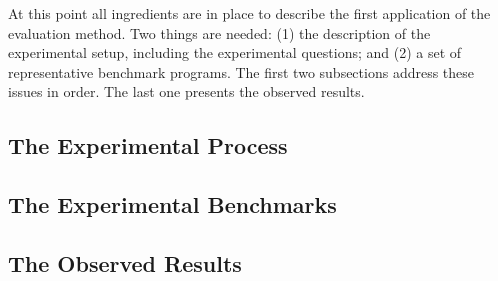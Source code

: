
At this point all ingredients are in place to describe the first application of
the evaluation method. Two things are needed: (1) the description of the
experimental setup, including the experimental questions; and (2) a set of
representative benchmark programs. The first two subsections address these
issues in order. The last one presents the observed results.

\def\rsub#1#2{\subsection{#2} \label{sub:#1} }

\rsub{experiment}{The Experimental Process} 

\rsub{benchmarks}{The Experimental Benchmarks}
\rsub{observed}  {The Observed Results}

